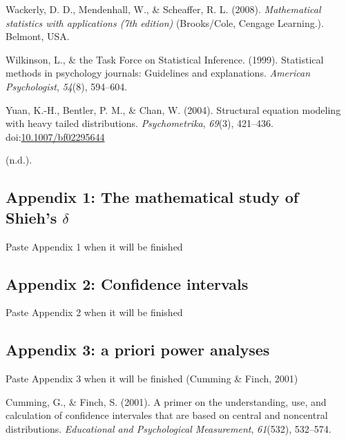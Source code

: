 \documentclass[
  man,floatsintext]{apa6}
\begin{document}
\leavevmode\hypertarget{ref-Wackerly_et_al_2008}{}%
Wackerly, D. D., Mendenhall, W., \& Scheaffer, R. L. (2008). \emph{Mathematical statistics with applications (7th edition)} (Brooks/Cole, Cengage Learning.). Belmont, USA.

\leavevmode\hypertarget{ref-Wilkinson_1999}{}%
Wilkinson, L., \& the Task Force on Statistical Inference. (1999). Statistical methods in psychology journals: Guidelines and explanations. \emph{American Psychologist}, \emph{54}(8), 594--604.

\leavevmode\hypertarget{ref-Yuan_et_al_2004}{}%
Yuan, K.-H., Bentler, P. M., \& Chan, W. (2004). Structural equation modeling with heavy tailed distributions. \emph{Psychometrika}, \emph{69}(3), 421--436. doi:\href{https://doi.org/10.1007/bf02295644}{10.1007/bf02295644}

\leavevmode\hypertarget{ref-Keselman_et_al_2008}{}%
(n.d.).

\clearpage
\makeatletter
\efloat@restorefloats
\makeatother


\begin{appendix}
\section{}
\setlength{\parindent}{0.0in}
\setlength{\leftskip}{0.0in}

\hypertarget{appendix-1-the-mathematical-study-of-shiehs-delta}{%
\subsection{\texorpdfstring{Appendix 1: The mathematical study of
Shieh's
\(\delta\)}{Appendix 1: The mathematical study of Shieh's \textbackslash delta}}\label{appendix-1-the-mathematical-study-of-shiehs-delta}}

Paste Appendix 1 when it will be finished

\hypertarget{appendix-2-confidence-intervals}{%
\subsection{Appendix 2: Confidence
intervals}\label{appendix-2-confidence-intervals}}

Paste Appendix 2 when it will be finished

\hypertarget{appendix-3-a-priori-power-analyses}{%
\subsection{Appendix 3: a priori power
analyses}\label{appendix-3-a-priori-power-analyses}}

Paste Appendix 3 when it will be finished (Cumming \& Finch, 2001)

\hypertarget{refs}{}
\leavevmode\hypertarget{ref-Cumming_Finch_2001}{}%
Cumming, G., \& Finch, S. (2001). A primer on the understanding, use,
and calculation of confidence intervales that are based on central and
noncentral distributions. \emph{Educational and Psychological
Measurement}, \emph{61}(532), 532--574.
\end{appendix}
\end{document}

